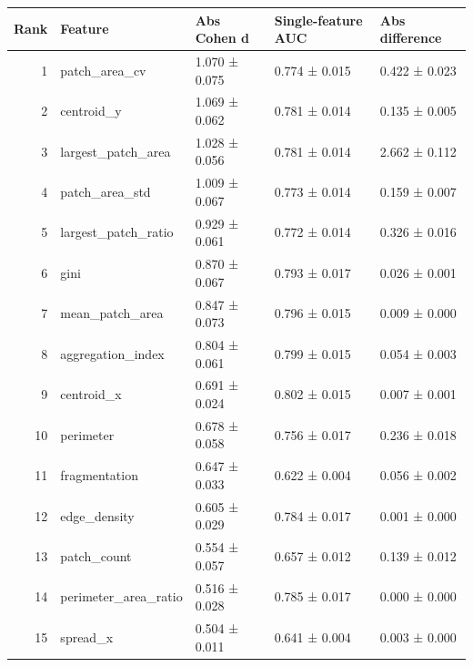 \begin{tabular}{rllll}
\toprule
Rank & Feature & Abs Cohen d & Single-feature AUC & Abs difference \\
\midrule
1 & patch_area_cv & 1.070 ± 0.075 & 0.774 ± 0.015 & 0.422 ± 0.023 \\
2 & centroid_y & 1.069 ± 0.062 & 0.781 ± 0.014 & 0.135 ± 0.005 \\
3 & largest_patch_area & 1.028 ± 0.056 & 0.781 ± 0.014 & 2.662 ± 0.112 \\
4 & patch_area_std & 1.009 ± 0.067 & 0.773 ± 0.014 & 0.159 ± 0.007 \\
5 & largest_patch_ratio & 0.929 ± 0.061 & 0.772 ± 0.014 & 0.326 ± 0.016 \\
6 & gini & 0.870 ± 0.067 & 0.793 ± 0.017 & 0.026 ± 0.001 \\
7 & mean_patch_area & 0.847 ± 0.073 & 0.796 ± 0.015 & 0.009 ± 0.000 \\
8 & aggregation_index & 0.804 ± 0.061 & 0.799 ± 0.015 & 0.054 ± 0.003 \\
9 & centroid_x & 0.691 ± 0.024 & 0.802 ± 0.015 & 0.007 ± 0.001 \\
10 & perimeter & 0.678 ± 0.058 & 0.756 ± 0.017 & 0.236 ± 0.018 \\
11 & fragmentation & 0.647 ± 0.033 & 0.622 ± 0.004 & 0.056 ± 0.002 \\
12 & edge_density & 0.605 ± 0.029 & 0.784 ± 0.017 & 0.001 ± 0.000 \\
13 & patch_count & 0.554 ± 0.057 & 0.657 ± 0.012 & 0.139 ± 0.012 \\
14 & perimeter_area_ratio & 0.516 ± 0.028 & 0.785 ± 0.017 & 0.000 ± 0.000 \\
15 & spread_x & 0.504 ± 0.011 & 0.641 ± 0.004 & 0.003 ± 0.000 \\
\bottomrule
\end{tabular}
